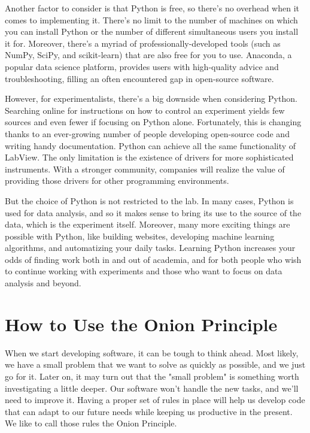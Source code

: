 Another factor to consider is that Python is free, so there's no overhead when it comes to implementing it. There's no limit to the number of machines on which you can install Python or the number of different simultaneous users you install it for. Moreover, there's a myriad of professionally-developed tools (such as NumPy, SciPy, and scikit-learn) that are also free for you to use. Anaconda, a popular data science platform, provides users with high-quality advice and troubleshooting, filling an often encountered gap in open-source software.

However, for experimentalists, there's a big downside when considering Python. Searching online for instructions on how to control an experiment yields few sources and even fewer if focusing on Python alone. Fortunately, this is changing thanks to an ever-growing number of people developing open-source code and writing handy documentation. Python can achieve all the same functionality of LabView. The only limitation is the existence of drivers for more sophisticated instruments. With a stronger community, companies will realize the value of providing those drivers for other programming environments.

But the choice of Python is not restricted to the lab. In many cases, Python is used for data analysis, and so it makes sense to bring its use to the source of the data, which is the experiment itself. Moreover, many more exciting things are possible with Python, like building websites, developing machine learning algorithms, and automatizing your daily tasks. Learning Python increases your odds of finding work both in and out of academia, and for both people who wish to continue working with experiments and those who want to focus on data analysis and beyond.

\section{How to Use the Onion Principle}\label{sec:onion-principle}
When we start developing software, it can be tough to think ahead. Most likely, we have a small problem that we want to solve as quickly as possible, and we just go for it. Later on, it may turn out that the "small problem" is something worth investigating a little deeper. Our software won't handle the new tasks, and we'll need to improve it. Having a proper set of rules in place will help us develop code that can adapt to our future needs while keeping us productive in the present. We like to call those rules the Onion Principle.

